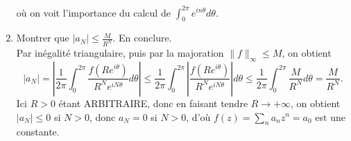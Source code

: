 \documentclass[a4paper,10pt]{article}
\newcommand{\norm}[1]{\|#1\|}
\newcommand{\abs}[1]{\left|#1\right|}
\newcommand{\correction}[1]{{\color{red}#1}}
\begin{document}
\begin{enumerate}[label=\alph*)]
{    où on voit l'importance du calcul de $\int_0^{2\pi}e^{in\theta}d\theta$.}
    \item Montrer que $\abs{a_N}\leq\frac{M}{R^N}$. En conclure.\\
    \correction{Par inégalité triangulaire, puis par la majoration $\norm{f}_\infty\leq M$, on obtient
    $$\abs{a_N}=\abs{\frac{1}{2\pi}\int_0^{2\pi}\frac{f(Re^{i\theta})}{R^Ne^{iN\theta}}d\theta}\leq
    \frac{1}{2\pi}\int_0^{2\pi}\abs{\frac{f(Re^{i\theta})}{R^Ne^{iN\theta}}}d\theta\leq
    \frac{1}{2\pi}\int_0^{2\pi}\frac{M}{R^N}d\theta=\frac{M}{R^N}.$$
    Ici $R>0$ étant ARBITRAIRE, donc en faisant tendre $R\to+\infty$, on obtient $\abs{a_N}\leq 0$ si $N>0$, donc $a_N=0$ si $N>0$, d'où $f(z)=\sum_n a_nz^n=a_0$ est une constante.}
\end{enumerate}  
\end{document}
